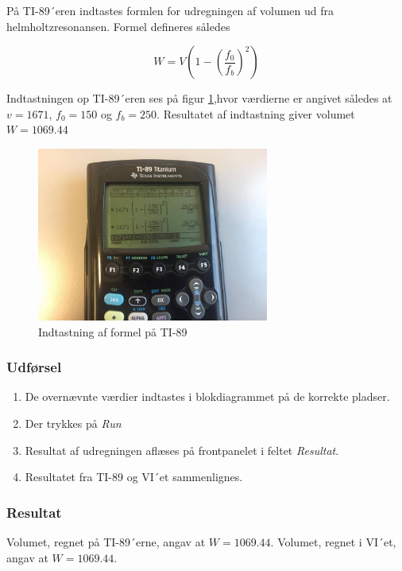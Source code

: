 		På TI-89´eren indtastes formlen for udregningen af volumen ud fra helmholtzresonansen. Formel defineres således 
		
		\begin{equation}
		W = V\left(1-\left(\frac{f_{0}}{f_{b}}\right)^2\right)
		\end{equation}
		
		Indtastningen op TI-89´eren ses på figur \ref{fig:TI89},hvor værdierne er angivet således at $v=1671$, $f_0=150$ og $f_b=250$. Resultatet af indtastning giver volumet $W=1069.44$
		
		\begin{figure}[htb]
			\centering
			\includegraphics[width=3in]{TI-89}
			\caption{Indtastning af formel på TI-89 }
			\label{fig:TI89}
		\end{figure}
		
	
	
		\subsubsection{Udførsel}
			 
         \begin{enumerate}
         \item De overnævnte værdier indtastes i blokdiagrammet på de korrekte pladser.
         \item Der trykkes på \textit{Run} 
         \item Resultat af udregningen aflæses på frontpanelet i feltet \textit{Resultat}. 
         \item Resultatet fra TI-89 og VI´et sammenlignes.  
         \end{enumerate}
         
        \subsubsection{Resultat}
        
        Volumet, regnet på TI-89´erne, angav at $W=1069.44$.
        Volumet, regnet i VI´et, angav at $W=1069.44$.

